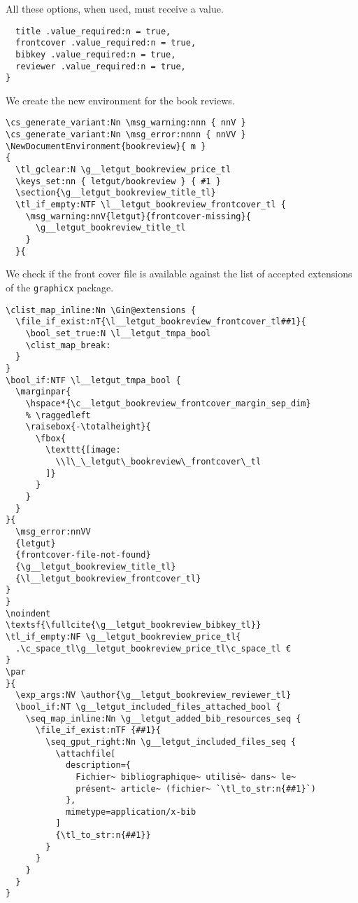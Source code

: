 \documentclass{letgut}
\begin{document}
All these options, when used, must receive a value.

\begin{lstlisting}
  title .value_required:n = true,
  frontcover .value_required:n = true,
  bibkey .value_required:n = true,
  reviewer .value_required:n = true,
}
\end{lstlisting}

We create the new environment for the book reviews.

\begin{lstlisting}
\cs_generate_variant:Nn \msg_warning:nnn { nnV }
\cs_generate_variant:Nn \msg_error:nnnn { nnVV }
\NewDocumentEnvironment{bookreview}{ m }
{
  \tl_gclear:N \g__letgut_bookreview_price_tl
  \keys_set:nn { letgut/bookreview } { #1 }
  \section{\g__letgut_bookreview_title_tl}
  \tl_if_empty:NTF \l__letgut_bookreview_frontcover_tl {
    \msg_warning:nnV{letgut}{frontcover-missing}{
      \g__letgut_bookreview_title_tl
    }
  }{
\end{lstlisting}

We check if the front cover file is available against the list of accepted
extensions of the \lstinline+graphicx+ package.

\begin{lstlisting}
\clist_map_inline:Nn \Gin@extensions {
  \file_if_exist:nT{\l__letgut_bookreview_frontcover_tl##1}{
    \bool_set_true:N \l__letgut_tmpa_bool
    \clist_map_break:
  }
}
\bool_if:NTF \l__letgut_tmpa_bool {
  \marginpar{
    \hspace*{\c__letgut_bookreview_frontcover_margin_sep_dim}
    % \raggedleft
    \raisebox{-\totalheight}{
      \fbox{
        \texttt{[image: 
          \\l\_\_letgut\_bookreview\_frontcover\_tl
        ]}
      }
    }
  }
}{
  \msg_error:nnVV
  {letgut}
  {frontcover-file-not-found}
  {\g__letgut_bookreview_title_tl}
  {\l__letgut_bookreview_frontcover_tl}
}
}
\noindent
\textsf{\fullcite{\g__letgut_bookreview_bibkey_tl}}
\tl_if_empty:NF \g__letgut_bookreview_price_tl{
  .\c_space_tl\g__letgut_bookreview_price_tl\c_space_tl €
}
\par
}{
  \exp_args:NV \author{\g__letgut_bookreview_reviewer_tl}
  \bool_if:NT \g__letgut_included_files_attached_bool {
    \seq_map_inline:Nn \g__letgut_added_bib_resources_seq {
      \file_if_exist:nTF {##1}{
        \seq_gput_right:Nn \g__letgut_included_files_seq {
          \attachfile[
            description={
              Fichier~ bibliographique~ utilisé~ dans~ le~
              présent~ article~ (fichier~ `\tl_to_str:n{##1}`)
            },
            mimetype=application/x-bib
          ]
          {\tl_to_str:n{##1}}
        }
      }
    }
  }
}
\end{lstlisting}
\end{document}
